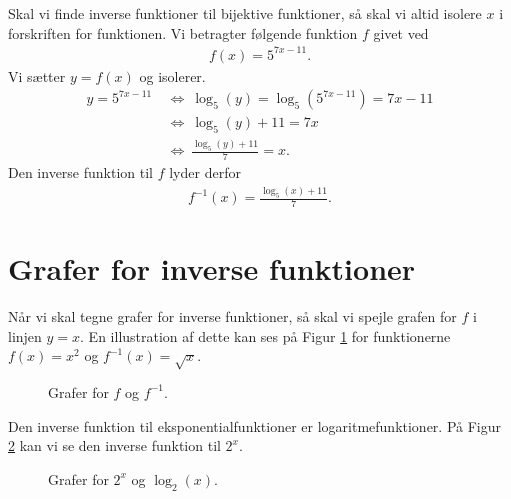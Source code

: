 \begin{exa}
	Skal vi finde inverse funktioner til bijektive funktioner, så skal vi altid isolere $x$ i forskriften for 
	funktionen. Vi betragter følgende funktion $f$ givet ved
	\begin{align*}
		f(x) = 5^{7x-11}.
	\end{align*}
	Vi sætter $y = f(x)$ og isolerer.
	\begin{align*}
		y = 5^{7x-11} \ &\Leftrightarrow \ \log_5(y) = \log_5(5^{7x-11}) = 7x-11 \\
		&\Leftrightarrow	 \ \log_5(y)+11 = 7x \\
		&\Leftrightarrow	 \ \frac{\log_5(y)+11}{7} = x.
	\end{align*}
	Den inverse funktion til $f$ lyder derfor
	\begin{align*}
		f^{-1}(x) = \frac{\log_5(x) + 11}{7}.
	\end{align*}
\end{exa}

\section*{Grafer for inverse funktioner}

Når vi skal tegne grafer for inverse funktioner, så skal vi spejle grafen for $f$ i linjen $y = x$. En illustration af dette kan ses på Figur \ref{fig:invgraf} for funktionerne $f(x) = x^2$ og $f^{-1}(x) = \sqrt{x}$.

\begin{figure}[H]
	\centering
	\caption{Grafer for $f$ og $f^{-1}$.}
	\label{fig:invgraf}
\end{figure}

Den inverse funktion til eksponentialfunktioner er logaritmefunktioner. På Figur \ref{fig:invgraflog} kan vi se 
den inverse funktion til $2^x$. 
\begin{figure}[H]
	\centering
	\caption{Grafer for $2^x$ og $\log_{2}(x)$.}
	\label{fig:invgraflog}
\end{figure}

